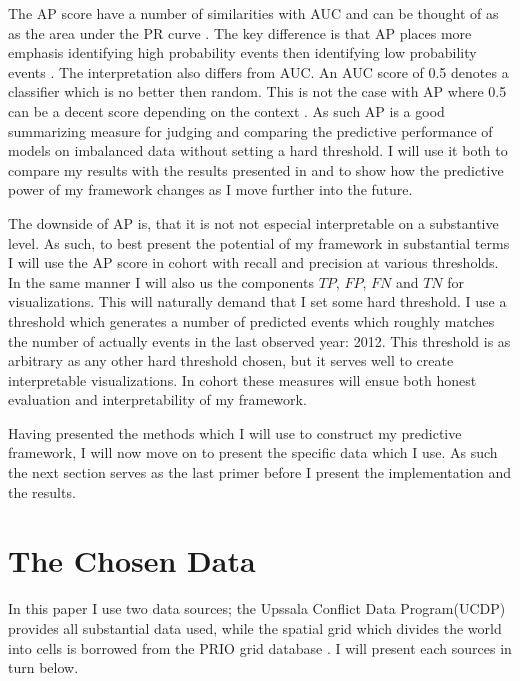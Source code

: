 \documentclass[a4paper]{article}
\begin{document}
The AP score have a number of similarities with AUC and can be thought of as as the area under the PR curve  \citep[349-350]{su2015relationship}. The key difference is that AP places more emphasis identifying high probability events then identifying low probability events \citep[350]{su2015relationship}. The interpretation also differs from AUC. An AUC score of 0.5 denotes a classifier which is no better then random. This is not the case with AP where 0.5 can be a decent score depending on the context \citep[350-351]{su2015relationship}. As such AP is a good summarizing measure for judging and comparing the predictive performance of models on imbalanced data without setting a hard threshold. I will use it both to compare my results with the results presented in \cite{Maase} and to show how the predictive power of my framework changes as I move further into the future.\par

The downside of AP is, that it is not not especial interpretable on a substantive level. As such, to best present the potential of my framework in substantial terms I will use the AP score in cohort with recall and precision at various thresholds. In the same manner I will also us the components $TP$, $FP$, $FN$ and $TN$ for visualizations. This will naturally demand that I set some hard threshold. I use a threshold which generates a number of predicted events which roughly matches the number of actually events in the last observed year: 2012. This threshold is as arbitrary as any other hard threshold chosen, but it serves well to create interpretable visualizations. In cohort these measures will ensue both honest evaluation and interpretability of my framework.\par %

Having presented the methods which I will use to construct my predictive framework, I will now move on to present the specific data which I use. As such the next section serves as the last primer before I present the implementation and the results.\par

\section{The Chosen Data}\label{data}%

In this paper I use two data sources; the Upssala Conflict Data Program(UCDP) \citep{Sundberg_2013, Croicu_Sundberg_2017} provides all substantial data used, while the spatial grid which divides the world into cells is borrowed from the PRIO grid database \citep{Tollefsen_2012}. I will present each sources in turn below.\par
\end{document}
